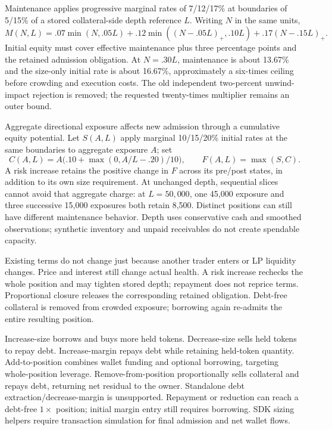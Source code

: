 Maintenance applies progressive marginal rates of 7/12/17\% at boundaries of 5/15\% of a stored collateral-side depth reference $L$. Writing $N$ in the same units,
\[
M(N,L)=.07\min(N,.05L)+.12\min((N-.05L)_+,.10L)+.17(N-.15L)_+.
\]
Initial equity must cover effective maintenance plus three percentage points and the retained admission obligation. At $N=.30L$, maintenance is about 13.67\% and the size-only initial rate is about 16.67\%, approximately a six-times ceiling before crowding and execution costs. The old independent two-percent unwind-impact rejection is removed; the requested twenty-times multiplier remains an outer bound.

Aggregate directional exposure affects new admission through a cumulative equity potential. Let $S(A,L)$ apply marginal 10/15/20\% initial rates at the same boundaries to aggregate exposure $A$; set
\[
C(A,L)=A\bigl(.10+\max(0,A/L-.20)/10\bigr),\qquad F(A,L)=\max(S,C).
\]
A risk increase retains the positive change in $F$ across its pre/post states, in addition to its own size requirement. At unchanged depth, sequential slices cannot avoid that aggregate charge: at $L=50{,}000$, one 45,000 exposure and three successive 15,000 exposures both retain 8,500. Distinct positions can still have different maintenance behavior. Depth uses conservative cash and smoothed observations; synthetic inventory and unpaid receivables do not create spendable capacity.

Existing terms do not change just because another trader enters or LP liquidity changes. Price and interest still change actual health. A risk increase rechecks the whole position and may tighten stored depth; repayment does not reprice terms. Proportional closure releases the corresponding retained obligation. Debt-free collateral is removed from crowded exposure; borrowing again re-admits the entire resulting position.

Increase-size borrows and buys more held tokens. Decrease-size sells held tokens to repay debt. Increase-margin repays debt while retaining held-token quantity. Add-to-position combines wallet funding and optional borrowing, targeting whole-position leverage. Remove-from-position proportionally sells collateral and repays debt, returning net residual to the owner. Standalone debt extraction/decrease-margin is unsupported. Repayment or reduction can reach a debt-free $1\times$ position; initial margin entry still requires borrowing. SDK sizing helpers require transaction simulation for final admission and net wallet flows.


